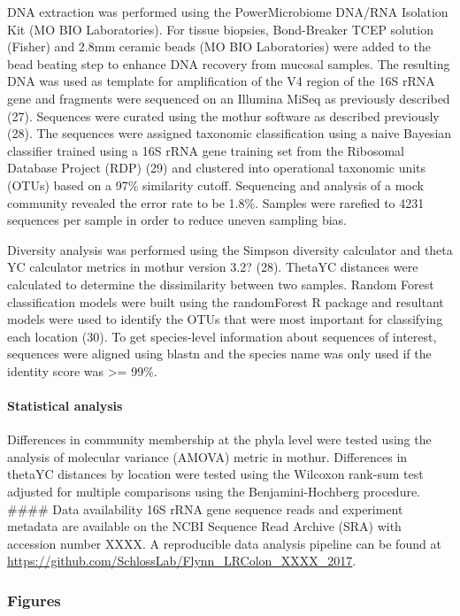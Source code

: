 \documentclass[11pt,]{article}
\let\oldparagraph\paragraph
\renewcommand{\paragraph}[1]{\oldparagraph{#1}\mbox{}}
\begin{document}
DNA extraction was performed using the PowerMicrobiome DNA/RNA Isolation
Kit (MO BIO Laboratories). For tissue biopsies, Bond-Breaker TCEP
solution (Fisher) and 2.8mm ceramic beads (MO BIO Laboratories) were
added to the bead beating step to enhance DNA recovery from mucosal
samples. The resulting DNA was used as template for amplification of the
V4 region of the 16S rRNA gene and fragments were sequenced on an
Illumina MiSeq as previously described (27). Sequences were curated
using the mothur software as described previously (28). The sequences
were assigned taxonomic classification using a naive Bayesian classifier
trained using a 16S rRNA gene training set from the Ribosomal Database
Project (RDP) (29) and clustered into operational taxonomic units (OTUs)
based on a 97\% similarity cutoff. Sequencing and analysis of a mock
community revealed the error rate to be 1.8\%. Samples were rarefied to
4231 sequences per sample in order to reduce uneven sampling bias.

Diversity analysis was performed using the Simpson diversity calculator
and theta YC calculator metrics in mothur version 3.2? (28). ThetaYC
distances were calculated to determine the dissimilarity between two
samples. Random Forest classification models were built using the
randomForest R package and resultant models were used to identify the
OTUs that were most important for classifying each location (30). To get
species-level information about sequences of interest, sequences were
aligned using blastn and the species name was only used if the identity
score was \textgreater{}= 99\%.

\paragraph{Statistical analysis}\label{statistical-analysis}

Differences in community membership at the phyla level were tested using
the analysis of molecular variance (AMOVA) metric in mothur. Differences
in thetaYC distances by location were tested using the Wilcoxon rank-sum
test adjusted for multiple comparisons using the Benjamini-Hochberg
procedure. \#\#\#\# Data availability 16S rRNA gene sequence reads and
experiment metadata are available on the NCBI Sequence Read Archive
(SRA) with accession number XXXX. A reproducible data analysis pipeline
can be found at
\url{https://github.com/SchlossLab/Flynn_LRColon_XXXX_2017}.

\newpage

\subsubsection{Figures}\label{figures}
\end{document}
